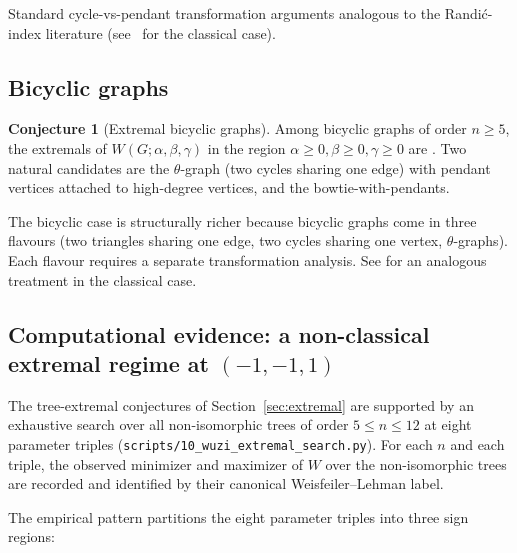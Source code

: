 \documentclass[11pt,a4paper]{article}
\theoremstyle{definition}
\newtheorem{conjecture}[theorem]{Conjecture}
\newcommand{\Wuzi}{W(G;\alpha,\beta,\gamma)}
\newcommand{\todo}[1]{}
\begin{document}
\todo{PROOF STRATEGY} Standard cycle-vs-pendant transformation
arguments analogous to the Randi\'c-index literature
(see~\cite{HansenMelot2003unicyclicRandic} for the classical case).

\subsection{Bicyclic graphs}

\begin{conjecture}[Extremal bicyclic graphs]\label{conj:bicyclic}
Among bicyclic graphs of order $n\ge 5$, the extremals of $\Wuzi$
in the region $\alpha\ge 0,\beta\ge 0,\gamma\ge 0$ are
\todo{TO BE CHARACTERIZED}. Two natural candidates are the
$\theta$-graph (two cycles sharing one edge) with pendant vertices
attached to high-degree vertices, and the bowtie-with-pendants.
\end{conjecture}

\todo{PROOF STRATEGY} The bicyclic case is structurally richer
because bicyclic graphs come in three flavours (two triangles
sharing one edge, two cycles sharing one vertex, $\theta$-graphs).
Each flavour requires a separate transformation analysis. See
\cite{HansenMelot2005bicyclicBounds} for an analogous treatment in
the classical case.

\subsection{Computational evidence: a non-classical extremal regime at $(-1, -1, 1)$}
\label{sec:caterpillar}

The tree-extremal conjectures of Section~\ref{sec:extremal} are
supported by an exhaustive search over all non-isomorphic trees of
order $5 \le n \le 12$ at eight parameter triples
(\texttt{scripts/10\_wuzi\_extremal\_search.py}). For each $n$ and each
triple, the observed minimizer and maximizer of $W$ over the
non-isomorphic trees are recorded and identified by their canonical
Weisfeiler--Lehman label.

The empirical pattern partitions the eight parameter triples into
three sign regions:
\end{document}
